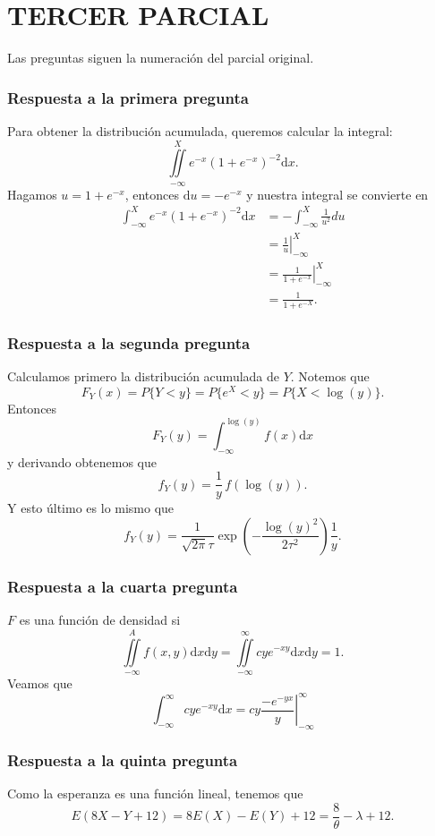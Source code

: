 

	\thispagestyle{plain}
\chapter*{TERCER PARCIAL}
\noindent Las preguntas siguen la numeración del parcial original.
\subsection{Respuesta a la primera pregunta}
Para obtener la distribución acumulada, queremos calcular la integral:
\[ \iint\limits_{-\infty}^{X} e^{-x}(1+e^{-x})^{-2} \mathrm{d}x. \]
Hagamos $u=1+e^{-x}$, entonces $\mathrm{d}u=-e^{-x}$ y nuestra integral se convierte en
\begin{align*}
	\int_{-\infty}^{X} e^{-x}(1+e^{-x})^{-2} \mathrm{d}x &= -\int_{-\infty}^{X} \frac{1}{u^2} du \\
														&= \left.\frac{1}{u}\right|_{-\infty}^X \\
														&= \left.\frac{1}{1+e^{-x}}\right|_{-\infty}^X \\
														&= \frac{1}{1+e^{-X}}.
\end{align*}
\subsection{Respuesta a la segunda pregunta}
Calculamos primero la distribución acumulada de $Y$. Notemos que 
\[ F_Y(x) = P\{ Y<y \} = P\{ e^X<y \} = P\{X<\log(y) \}. \]
Entonces
\[ F_Y(y) = \int_{-\infty}^{\log(y)} f(x) \mathrm{d}x \]
y derivando obtenemos que
\[ f_Y(y) = \frac{1}{y}\, f(\log(y)). \]
Y esto último es lo mismo que
\[ f_Y(y) = \frac{1}{\sqrt{2\pi}\tau} \exp\left(-\frac{\log(y)^2}{2\tau^2}\right) \frac{1}{y}. \]
\subsection{Respuesta a la cuarta pregunta}

 $F$ es una función de densidad si
	\[ \iint\limits_{-\infty}^{A} f(x,y) \mathrm{d}x\mathrm{d}y = \iint\limits_{-\infty}^{\infty} cye^{-xy} \mathrm{d}x\mathrm{d}y = 1. \]
	Veamos que
	\[ \int_{-\infty}^{\infty} cye^{-xy} \mathrm{d}x = \left. cy \frac{-e^{-yx}}{y}\right|_{-\infty}^{\infty} \]
\subsection{Respuesta a la quinta pregunta}
Como la esperanza es una función lineal, tenemos que
\[ E(8X-Y+12) = 8E(X) -E(Y) + 12 = \frac{8}{\theta} - \lambda + 12.\]
